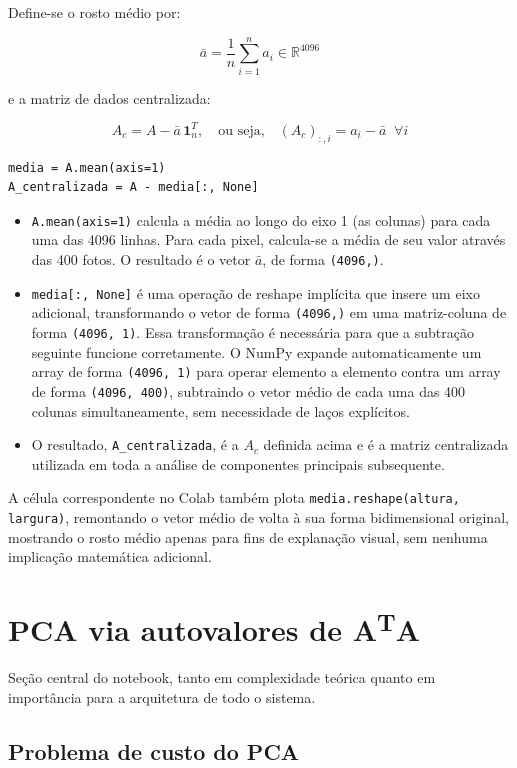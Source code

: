 \documentclass[12pt,a4paper]{article}
\begin{document}
Define-se o rosto médio por:

$$\bar{a} = \frac{1}{n}\sum_{i=1}^{n} a_i \in \mathbb{R}^{4096}$$

e a matriz de dados centralizada:

$$A_c = A - \bar{a}\,\mathbf{1}_n^T, \quad \text{ou seja,} \quad (A_c)_{:,i} = a_i - \bar{a} \;\; \forall i$$

\begin{lstlisting}
media = A.mean(axis=1)
A_centralizada = A - media[:, None]
\end{lstlisting}

\begin{itemize}
  \item \texttt{A.mean(axis=1)} calcula a média ao longo do eixo 1 (as colunas) para cada uma das
  4096 linhas. Para cada pixel, calcula-se a média de seu valor através das
  400 fotos. O resultado é o vetor $\bar{a}$, de forma \texttt{(4096,)}.
  \item \texttt{media[:, None]} é uma operação de reshape implícita que insere um eixo adicional,
  transformando o vetor de forma \texttt{(4096,)} em uma matriz-coluna de forma \texttt{(4096, 1)}.
  Essa transformação é necessária para que a subtração seguinte funcione
  corretamente. O NumPy expande automaticamente um array de forma
  \texttt{(4096, 1)} para operar elemento a elemento contra um array de forma \texttt{(4096, 400)},
  subtraindo o vetor médio de cada uma das 400 colunas simultaneamente, sem
  necessidade de laços explícitos.
  \item O resultado, \texttt{A\_centralizada}, é a $A_c$ definida acima e é a matriz centralizada
  utilizada em toda a análise de componentes principais subsequente.
\end{itemize}

A célula correspondente no Colab também plota \texttt{media.reshape(altura, largura)}, remontando o vetor médio de
volta à sua forma bidimensional original, mostrando o rosto médio apenas para fins de explanação visual, sem
nenhuma implicação matemática adicional.

\section{PCA via autovalores de A\textsuperscript{T}A}

Seção central do notebook, tanto em complexidade teórica quanto em
importância para a arquitetura de todo o sistema.

\subsection{Problema de custo do PCA}
\end{document}
